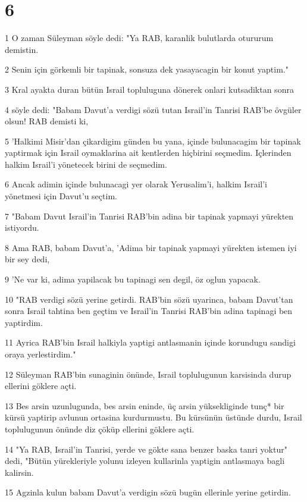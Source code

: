 \chapter{6}

\par 1 O zaman Süleyman söyle dedi: "Ya RAB, karanlik bulutlarda otururum demistin.
\par 2 Senin için görkemli bir tapinak, sonsuza dek yasayacagin bir konut yaptim."
\par 3 Kral ayakta duran bütün Israil topluluguna dönerek onlari kutsadiktan sonra
\par 4 söyle dedi: "Babam Davut'a verdigi sözü tutan Israil'in Tanrisi RAB'be övgüler olsun! RAB demisti ki,
\par 5 'Halkimi Misir'dan çikardigim günden bu yana, içinde bulunacagim bir tapinak yaptirmak için Israil oymaklarina ait kentlerden hiçbirini seçmedim. Içlerinden halkim Israil'i yönetecek birini de seçmedim.
\par 6 Ancak adimin içinde bulunacagi yer olarak Yerusalim'i, halkim Israil'i yönetmesi için Davut'u seçtim.
\par 7 "Babam Davut Israil'in Tanrisi RAB'bin adina bir tapinak yapmayi yürekten istiyordu.
\par 8 Ama RAB, babam Davut'a, 'Adima bir tapinak yapmayi yürekten istemen iyi bir sey dedi,
\par 9 'Ne var ki, adima yapilacak bu tapinagi sen degil, öz oglun yapacak.
\par 10 "RAB verdigi sözü yerine getirdi. RAB'bin sözü uyarinca, babam Davut'tan sonra Israil tahtina ben geçtim ve Israil'in Tanrisi RAB'bin adina tapinagi ben yaptirdim.
\par 11 Ayrica RAB'bin Israil halkiyla yaptigi antlasmanin içinde korundugu sandigi oraya yerlestirdim."
\par 12 Süleyman RAB'bin sunaginin önünde, Israil toplulugunun karsisinda durup ellerini göklere açti.
\par 13 Bes arsin uzunlugunda, bes arsin eninde, üç arsin yüksekliginde tunç* bir kürsü yaptirip avlunun ortasina kurdurmustu. Bu kürsünün üstünde durdu, Israil toplulugunun önünde diz çöküp ellerini göklere açti.
\par 14 "Ya RAB, Israil'in Tanrisi, yerde ve gökte sana benzer baska tanri yoktur" dedi, "Bütün yürekleriyle yolunu izleyen kullarinla yaptigin antlasmaya bagli kalirsin.
\par 15 Agzinla kulun babam Davut'a verdigin sözü bugün ellerinle yerine getirdin.
